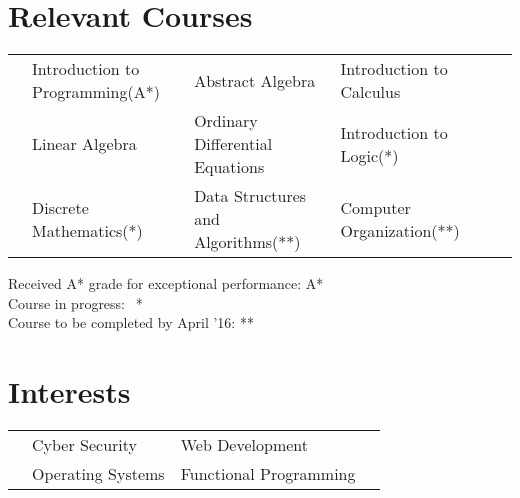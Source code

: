 \documentclass[11pt,a4paper]{article}
\begin{document}
\vspace{-0.4cm}
\section*{Relevant Courses}
\vspace{-0.2cm}
\begin{tabular}{L{0.05cm} L{5.8cm} L{6.5cm} L{7.5cm} L{8cm} L{13cm}}
& Introduction to Programming(A*)  & Abstract Algebra  & Introduction to Calculus\\
& Linear Algebra                     & Ordinary Differential  Equations & Introduction to Logic(*)\\
& Discrete Mathematics(*)            & Data Structures and Algorithms(**) & Computer Organization(**)\\
\end{tabular}

\vspace{-0.2cm}
\begin{flushright}
  \footnotesize{Received A* grade for exceptional performance: A*}\\
  \footnotesize{Course in progress:$\ \ $ *}\\
  \footnotesize{Course to be completed by April '16: **}
\end{flushright}

\vspace{-1.5cm}
\section*{Interests}
\vspace{-0.3cm}
\begin{tabular}{L{0.05cm} L{7cm} L{6.5cm} L{7.5cm}}
& Cyber Security    & Web Development\\
& Operating Systems & Functional Programming
\end{tabular}
\end{document}
